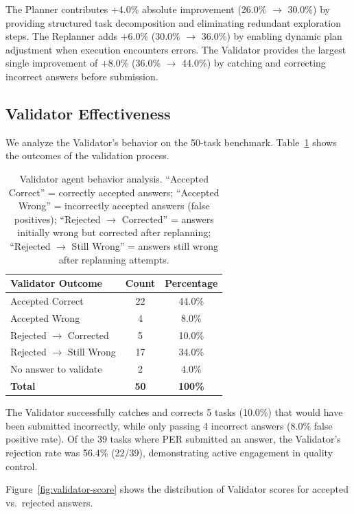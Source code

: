 \documentclass{article}
\begin{document}
The Planner contributes +4.0\% absolute improvement (26.0\% $\to$ 30.0\%) by providing structured task decomposition and eliminating redundant exploration steps.
The Replanner adds +6.0\% (30.0\% $\to$ 36.0\%) by enabling dynamic plan adjustment when execution encounters errors.
The Validator provides the largest single improvement of +8.0\% (36.0\% $\to$ 44.0\%) by catching and correcting incorrect answers before submission.

\subsection{Validator Effectiveness}

We analyze the Validator's behavior on the 50-task benchmark.
Table~\ref{tab:validator} shows the outcomes of the validation process.

\begin{table}[t]
\centering
\caption{Validator agent behavior analysis. ``Accepted Correct'' = correctly accepted answers; ``Accepted Wrong'' = incorrectly accepted answers (false positives); ``Rejected $\to$ Corrected'' = answers initially wrong but corrected after replanning; ``Rejected $\to$ Still Wrong'' = answers still wrong after replanning attempts.}
\label{tab:validator}
\begin{tabular}{lcc}
\toprule
\textbf{Validator Outcome} & \textbf{Count} & \textbf{Percentage} \\
\midrule
Accepted Correct       & 22 & 44.0\% \\
Accepted Wrong         &  4 &  8.0\% \\
Rejected $\to$ Corrected  &  5 & 10.0\% \\
Rejected $\to$ Still Wrong & 17 & 34.0\% \\
No answer to validate  &  2 &  4.0\% \\
\midrule
\textbf{Total}         & \textbf{50} & \textbf{100\%} \\
\bottomrule
\end{tabular}
\end{table}

The Validator successfully catches and corrects 5 tasks (10.0\%) that would have been submitted incorrectly, while only passing 4 incorrect answers (8.0\% false positive rate).
Of the 39 tasks where PER submitted an answer, the Validator's rejection rate was 56.4\% (22/39), demonstrating active engagement in quality control.

Figure~\ref{fig:validator-score} shows the distribution of Validator scores for accepted vs.\ rejected answers.
\end{document}
